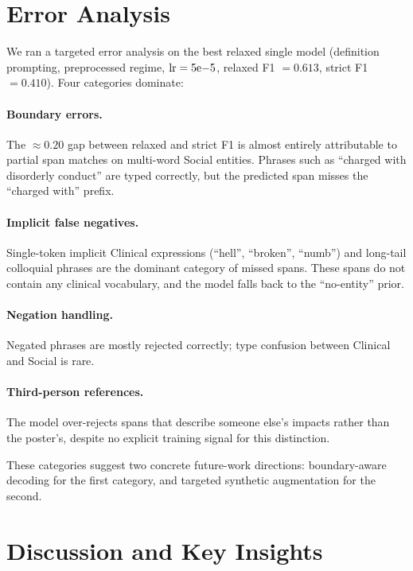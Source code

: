 \documentclass[11pt]{article}
\begin{document}
\section{Error Analysis}
\label{sec:error}

We ran a targeted error analysis on the best relaxed single model
(definition prompting, preprocessed regime, $\mathrm{lr}=5{\rm e}{-5}$,
relaxed F1 $= 0.613$, strict F1 $= 0.410$). Four categories dominate:

\paragraph{Boundary errors.} The $\approx 0.20$ gap between relaxed and strict F1 is almost entirely attributable to partial span matches on multi-word Social entities. Phrases such as ``charged with disorderly conduct'' are typed correctly, but the predicted span misses the ``charged with'' prefix.

\paragraph{Implicit false negatives.} Single-token implicit Clinical expressions (``hell'', ``broken'', ``numb'') and long-tail colloquial phrases are the dominant category of missed spans. These spans do not contain any clinical vocabulary, and the model falls back to the ``no-entity'' prior.

\paragraph{Negation handling.} Negated phrases are mostly rejected
correctly; type confusion between Clinical and Social is rare.

\paragraph{Third-person references.} The model over-rejects spans that
describe someone else's impacts rather than the poster's, despite no
explicit training signal for this distinction.

These categories suggest two concrete future-work directions:
boundary-aware decoding for the first category, and targeted synthetic
augmentation for the second.

\section{Discussion and Key Insights}
\label{sec:discussion}
\end{document}
